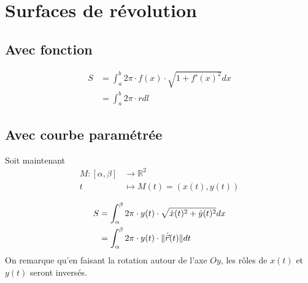 \documentclass[10pt,a4paper]{book}
\newcommand{\R}{\mathbb{R}}
\DeclarePairedDelimiter\norm{\lVert}{\rVert}
\begin{document}
\section{Surfaces de révolution}

\subsection{Avec fonction}
\begin{equation*}
\begin{split}
S &= \int_a^b 2\pi \cdot f(x) \cdot \sqrt{1+f'(x)^2}dx \\
&= \int_a^b 2\pi\cdot rdl
\end{split}
\end{equation*}

\subsection{Avec courbe paramétrée}
Soit maintenant
\begin{equation*}
\begin{split}
M:[\alpha,\beta] & \rightarrow \R^2 \\
t & \mapsto M(t) = (x(t), y(t))
\end{split}
\end{equation*}

\begin{equation*}
\begin{split}
S &= \int_\alpha^\beta 2\pi \cdot y(t) \cdot \sqrt{\dot{x}(t)^2 + \dot{y}(t)^2}dx \\
&= \int_\alpha^\beta 2\pi\cdot y(t) \cdot \norm{\dot{\vec{r}}(t)} dt
\end{split}
\end{equation*}
On remarque qu'en faisant la rotation autour de l'axe $Oy$, les rôles de $x(t)$ et $y(t)$ seront inversés. 
\end{document}
